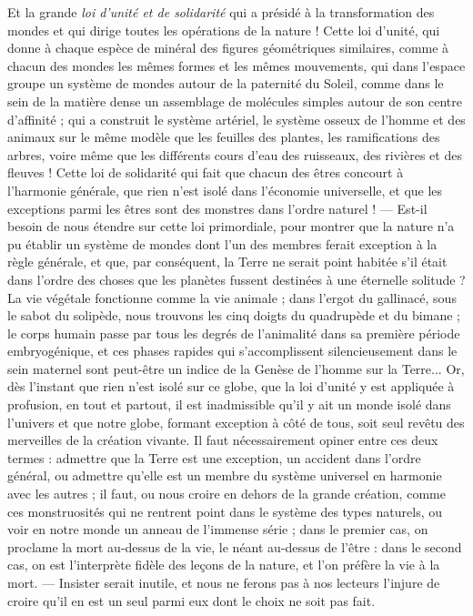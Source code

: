 \documentclass[a4paper, 11pt, oneside, landscape]{article}
\begin{document}
Et la grande \emph{loi d'unité et de solidarité} qui a présidé à la transformation des mondes et qui dirige toutes les opérations de la nature ! Cette loi d'unité, qui donne à chaque espèce de minéral des figures géométriques similaires, comme à chacun des mondes les mêmes formes et les mêmes mouvements, qui dans l'espace groupe un système de mondes autour de la paternité du Soleil, comme dans le sein de la matière dense un assemblage de molécules simples autour de son centre d'affinité ; qui a construit le système artériel, le système osseux de l'homme et des animaux sur le même modèle que les feuilles des plantes, les ramifications des arbres, voire même que les différents cours d'eau des ruisseaux, des rivières et des fleuves ! Cette loi de solidarité qui fait que chacun des êtres concourt à l'harmonie générale, que rien n'est isolé dans l'économie universelle, et que les exceptions parmi les êtres sont des monstres dans l'ordre naturel ! --- Est-il besoin de nous étendre sur cette loi primordiale, pour montrer que la nature n'a pu établir un système de mondes dont l'un des membres ferait exception à la règle générale, et que, par conséquent, la Terre ne serait point habitée s'il était dans l'ordre des choses que les planètes fussent destinées à une éternelle solitude ? La vie végétale fonctionne comme la vie animale ; dans l'ergot du gallinacé, sous le sabot du solipède, nous trouvons les cinq doigts du quadrupède et du bimane ; le corps humain passe par tous les degrés de l'animalité dans sa première période embryogénique, et ces phases rapides qui s'accomplissent silencieusement dans le sein maternel sont peut-être un indice de la Genèse de l'homme sur la Terre... Or, dès l'instant que rien n'est isolé sur ce globe, que la loi d'unité y est appliquée à profusion, en tout et partout, il est inadmissible qu'il y ait un monde isolé dans l'univers et que notre globe, formant exception à côté de tous, soit seul revêtu des merveilles de la création vivante. Il faut nécessairement opiner entre ces deux termes : admettre que la Terre est une exception, un accident dans l'ordre général, ou admettre qu'elle est un membre du système universel en harmonie avec les autres ; il faut, ou nous croire en dehors de la grande création, comme ces monstruosités qui ne rentrent point dans le système des types naturels, ou voir en notre monde un anneau de l'immense série ; dans le premier cas, on proclame la mort au-dessus de la vie, le néant au-dessus de l'être : dans le second cas, on est l'interprète fidèle des leçons de la nature, et l'on préfère la vie à la mort. --- Insister serait inutile, et nous ne ferons pas à nos lecteurs l'injure de croire qu'il en est un seul parmi eux dont le choix ne soit pas fait.
\end{document}
